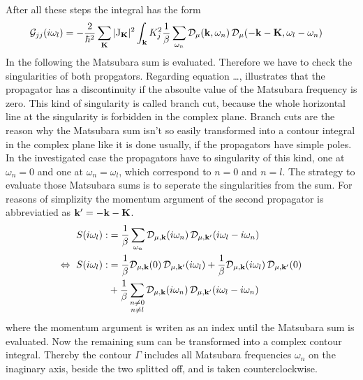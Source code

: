 After all these steps the integral has the form
%
\begin{align}
	\mathcal{G}_{jj}(i\omega_{l}) &= 
		-\frac{2}{\hbar^{2}} 
		\sum\limits_{\vb{K}} 
		\vert \mt{J}_{\vb{K}} \vert^{2}
		\int_{\vb{k}} K_{j}^{2}
		\frac{1}{\beta} \sum\limits_{\omega_{n}}
		\mathcal{D}_{\mu}(\vb{k},\omega_{n}) \,
		\mathcal{D}_{\mu}(-\vb{k}-\vb{K},\omega_{l}-\omega_{n})
		\label{eq: Green function on the imaginary axis}
\end{align}
%
In the following the Matsubara sum is evaluated.
Therefore we have to check the singularities of both propgators.
Regarding equation \dots {}, illustrates that the propagator has a discontinuity if the absoulte value of the Matsubara frequency is zero. 
This kind of singularity is called branch cut, because the whole horizontal line at the singularity is forbidden in the complex plane.
Branch cuts are the reason why the Matsubara sum isn't so easily transformed into a contour integral in the complex plane like it is done usually, if the propagators have simple poles.
In the investigated case the propagators have to singularity of this kind, one at $\omega_{n} = 0$ and one at $\omega_{n} = \omega_{l}$, which correspond to $n=0$ and $n=l$.
The strategy to evaluate those Matsubara sums is to seperate the singularities from the sum.
For reasons of simplizity the momentum argument of the second propagator is abbreviatied as $\vb{k}'=-\vb{k}-\vb{K}$.
%
\begin{align}
	S(i\omega_{l}) :&= \frac{1}{\beta} \sum\limits_{\omega_{n}} \mathcal{D}_{\mu,\vb{k}}(i\omega_{n}) \, \mathcal{D}_{\mu,\vb{k}'}(i\omega_{l}-i\omega_{n})
	\notag \\
	\Leftrightarrow\ S(i\omega_{l}) :&= 
		\frac{1}{\beta} \mathcal{D}_{\mu,\vb{k}}(0) \, \mathcal{D}_{\mu,\vb{k}'}(i\omega_{l})
		+
		\frac{1}{\beta} \mathcal{D}_{\mu,\vb{k}}(i\omega_{l}) \, \mathcal{D}_{\mu,\vb{k}'}(0)
		\notag \\
		&+
		\frac{1}{\beta} \sum\limits_{\substack{n \neq 0 \\ n \neq l}} \mathcal{D}_{\mu,\vb{k}}(i\omega_{n}) \, \mathcal{D}_{\mu,\vb{k}'}(i\omega_{l}-i\omega_{n})
	\label{eq: seperated Matsubara sum}
\end{align}
%
where the momentum argument is writen as an index until the Matsubara sum is evaluated.
Now the remaining sum can be transformed into a complex contour integral.
Thereby the contour $\Gamma$ includes all Matsubara frequencies $\omega_{n}$ on the inaginary axis, beside the two splitted off, and is taken counterclockwise.
